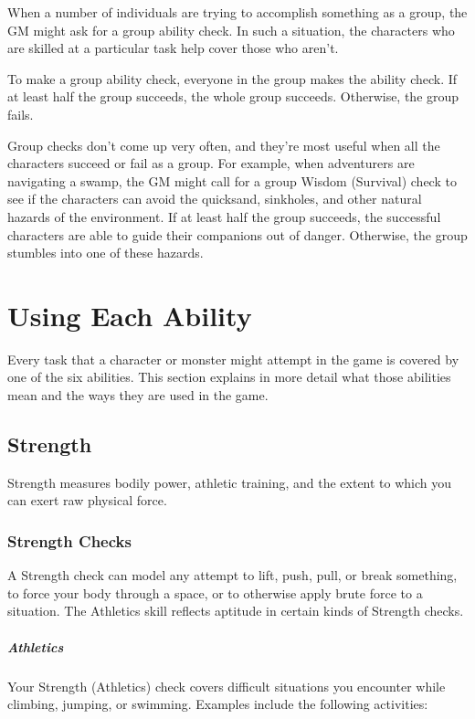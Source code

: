 When a number of individuals are trying to accomplish something as a group, the GM might ask for a group ability check. In such a situation, the characters who are skilled at a particular task help cover those who aren't.

To make a group ability check, everyone in the group makes the ability check. If at least half the group succeeds, the whole group succeeds. Otherwise, the group fails.

Group checks don't come up very often, and they're most useful when all the characters succeed or fail as a group. For example, when adventurers are navigating a swamp, the GM might call for a group Wisdom (Survival) check to see if the characters can avoid the quicksand, sinkholes, and other natural hazards of the environment. If at least half the group succeeds, the successful characters are able to guide their companions out of danger. Otherwise, the group stumbles into one of these hazards.

\section{Using Each Ability}

Every task that a character or monster might attempt in the game is covered by one of the six abilities. This section explains in more detail what those abilities mean and the ways they are used in the game.

\subsection{Strength}

Strength measures bodily power, athletic training, and the extent to which you can exert raw physical force.

\subsubsection{Strength Checks}

A Strength check can model any attempt to lift, push, pull, or break something, to force your body through a space, or to otherwise apply brute force to a situation. The Athletics skill reflects aptitude in certain kinds of Strength checks.

\subparagraph*{Athletics} Your Strength (Athletics) check covers difficult situations you encounter while climbing, jumping, or swimming. Examples include the following activities:

